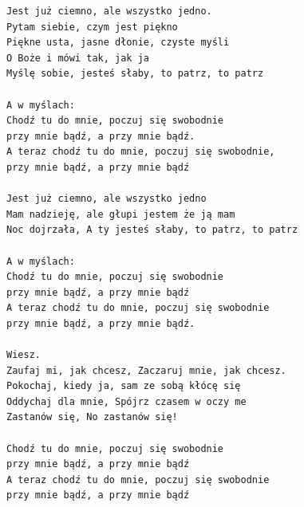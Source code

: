 \documentclass[12pt]{article}
\begin{document}
\begin{verbatim}
Jest już ciemno, ale wszystko jedno.
Pytam siebie, czym jest piękno
Piękne usta, jasne dłonie, czyste myśli
O Boże i mówi tak, jak ja
Myślę sobie, jesteś słaby, to patrz, to patrz

A w myślach:
Chodź tu do mnie, poczuj się swobodnie
przy mnie bądź, a przy mnie bądź.
A teraz chodź tu do mnie, poczuj się swobodnie,
przy mnie bądź, a przy mnie bądź

Jest już ciemno, ale wszystko jedno
Mam nadzieję, ale głupi jestem że ją mam
Noc dojrzała, A ty jesteś słaby, to patrz, to patrz

A w myślach:
Chodź tu do mnie, poczuj się swobodnie
przy mnie bądź, a przy mnie bądź
A teraz chodź tu do mnie, poczuj się swobodnie
przy mnie bądź, a przy mnie bądź.

Wiesz.
Zaufaj mi, jak chcesz, Zaczaruj mnie, jak chcesz.
Pokochaj, kiedy ja, sam ze sobą kłócę się
Oddychaj dla mnie, Spójrz czasem w oczy me
Zastanów się, No zastanów się!

Chodź tu do mnie, poczuj się swobodnie
przy mnie bądź, a przy mnie bądź
A teraz chodź tu do mnie, poczuj się swobodnie
przy mnie bądź, a przy mnie bądź
\end{verbatim}
\clearpage
\end{document}
